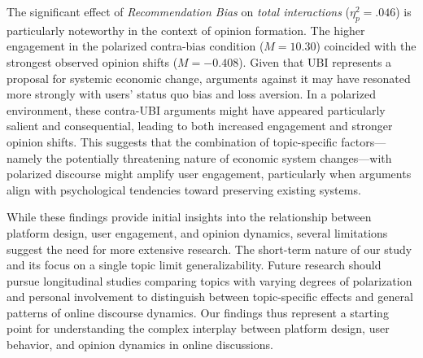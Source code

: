 The significant effect of \emph{Recommendation Bias} on \emph{total interactions} ($\eta^2_p = .046$) is particularly noteworthy in the context of opinion formation. The higher engagement in the polarized contra-bias condition ($M = 10.30$) coincided with the strongest observed opinion shifts ($M = -0.408$). Given that UBI represents a proposal for systemic economic change, arguments against it may have resonated more strongly with users' status quo bias and loss aversion. In a polarized environment, these contra-UBI arguments might have appeared particularly salient and consequential, leading to both increased engagement and stronger opinion shifts. This suggests that the combination of topic-specific factors---namely the potentially threatening nature of economic system changes---with polarized discourse might amplify user engagement, particularly when arguments align with psychological tendencies toward preserving existing systems.

While these findings provide initial insights into the relationship between platform design, user engagement, and opinion dynamics, several limitations suggest the need for more extensive research. The short-term nature of our study and its focus on a single topic limit generalizability. Future research should pursue longitudinal studies comparing topics with varying degrees of polarization and personal involvement to distinguish between topic-specific effects and general patterns of online discourse dynamics. Our findings thus represent a starting point for understanding the complex interplay between platform design, user behavior, and opinion dynamics in online discussions.

